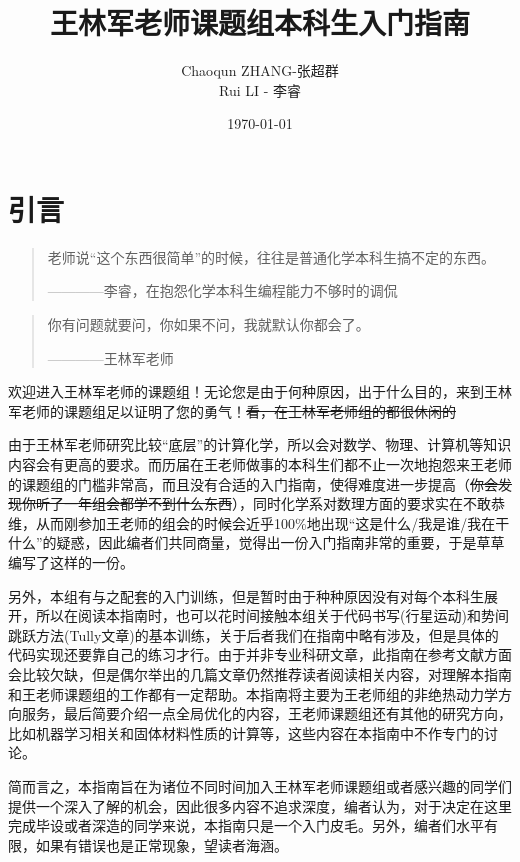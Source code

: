 \documentclass{article}
\title{王林军老师课题组本科生入门指南}
\author{Chaoqun ZHANG-张超群\\Rui LI - 李睿}
\date{\today}
\numberwithin{equation}{section}
\begin{document}
    \maketitle
    \tableofcontents
    \newpage
    \section{引言}
  \begin{quote}
    老师说``这个东西很简单''的时候，往往是普通化学本科生搞不定的东西。
    \begin{flushright}
      ————李睿，在抱怨化学本科生编程能力不够时的调侃
    \end{flushright}
  \end{quote}
  \begin{quote}
    你有问题就要问，你如果不问，我就默认你都会了。
    \begin{flushright}
      ————王林军老师
    \end{flushright}
  \end{quote}

  欢迎进入王林军老师的课题组！无论您是由于何种原因，出于什么目的，来到王林军老师的课题组足以证明了您的勇气！\sout{看，在王林军老师组的都很休闲的}

  由于王林军老师研究比较``底层''的计算化学，所以会对数学、物理、计算机等知识内容会有更高的要求。而历届在王老师做事的本科生们都不止一次地抱怨来王老师的课题组的门槛非常高，而且没有合适的入门指南，使得难度进一步提高（\sout{你会发现你听了一年组会都学不到什么东西}），同时化学系对数理方面的要求实在不敢恭维，从而刚参加王老师的组会的时候会近乎100\%地出现``这是什么/我是谁/我在干什么''的疑惑，因此编者们共同商量，觉得出一份入门指南非常的重要，于是草草编写了这样的一份。

  另外，本组有与之配套的入门训练，但是暂时由于种种原因没有对每个本科生展开，所以在阅读本指南时，也可以花时间接触本组关于代码书写(行星运动)和势间跳跃方法(Tully文章)的基本训练，关于后者我们在指南中略有涉及，但是具体的代码实现还要靠自己的练习才行。由于并非专业科研文章，此指南在参考文献方面会比较欠缺，但是偶尔举出的几篇文章仍然推荐读者阅读相关内容，对理解本指南和王老师课题组的工作都有一定帮助。本指南将主要为王老师组的非绝热动力学方向服务，最后简要介绍一点全局优化的内容，王老师课题组还有其他的研究方向，比如机器学习相关和固体材料性质的计算等，这些内容在本指南中不作专门的讨论。
  
  简而言之，本指南旨在为诸位不同时间加入王林军老师课题组或者感兴趣的同学们提供一个深入了解的机会，因此很多内容不追求深度，编者认为，对于决定在这里完成毕设或者深造的同学来说，本指南只是一个入门皮毛。另外，编者们水平有限，如果有错误也是正常现象，望读者海涵。
\end{document}
